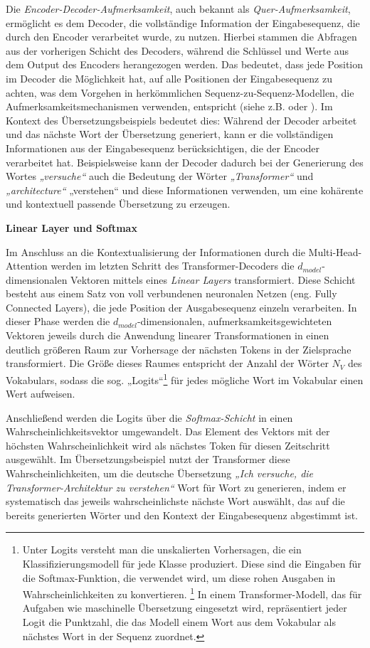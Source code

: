 Die \emph{Encoder-Decoder-Aufmerksamkeit}, auch bekannt als \emph{Quer-Aufmerksamkeit}, ermöglicht es dem Decoder, die vollständige Information der Eingabesequenz, die durch den Encoder verarbeitet wurde, zu nutzen. Hierbei stammen die Abfragen aus der vorherigen Schicht des Decoders, während die Schlüssel und Werte aus dem Output des Encoders herangezogen werden. Das bedeutet, dass jede Position im Decoder die Möglichkeit hat, auf alle Positionen der Eingabesequenz zu achten, was dem Vorgehen in herkömmlichen Sequenz-zu-Sequenz-Modellen, die Aufmerksamkeitsmechanismen verwenden, entspricht (siehe z.B. \cite{Conv_Seq2Seq_Learning} oder \cite{GoogleNeuralMachineTranslation}). Im Kontext des Übersetzungsbeispiels bedeutet dies: Während der Decoder arbeitet und das nächste Wort der Übersetzung generiert, kann er die vollständigen Informationen aus der Eingabesequenz berücksichtigen, die der Encoder verarbeitet hat. Beispielsweise kann der Decoder dadurch bei der Generierung des Wortes \emph{„versuche“} auch die Bedeutung der Wörter \emph{„Transformer“} und \emph{„architecture“} „verstehen“ und diese Informationen verwenden, um eine kohärente und kontextuell passende Übersetzung zu erzeugen.

\textbf{Linear Layer und Softmax}

Im Anschluss an die Kontextualisierung der Informationen durch die Multi-Head-Attention werden im letzten Schritt des Transformer-Decoders die $d_{model}$-dimensionalen Vektoren mittels eines \emph{Linear Layers} transformiert. Diese Schicht besteht aus einem Satz von voll verbundenen neuronalen Netzen (eng. Fully Connected Layers), die jede Position der Ausgabesequenz einzeln verarbeiten. In dieser Phase werden die $d_{model}$-dimensionalen, aufmerksamkeitsgewichteten Vektoren jeweils durch die Anwendung linearer Transformationen in einen deutlich größeren Raum zur Vorhersage der nächsten Tokens in der Zielsprache transformiert. Die Größe dieses Raumes entspricht der Anzahl der Wörter $N_V$ des Vokabulars, sodass die sog. „Logits“\footnote{Unter Logits versteht man die unskalierten Vorhersagen, die ein Klassifizierungsmodell für jede Klasse produziert. Diese sind die Eingaben für die Softmax-Funktion, die verwendet wird, um diese rohen Ausgaben in Wahrscheinlichkeiten zu konvertieren. \footcite{MitigatingNNOverconfidenceWithLogitNormalization} In einem Transformer-Modell, das für Aufgaben wie maschinelle Übersetzung eingesetzt wird, repräsentiert jeder Logit die Punktzahl, die das Modell einem Wort aus dem Vokabular als nächstes Wort in der Sequenz zuordnet.} für jedes mögliche Wort im Vokabular einen Wert aufweisen. 

Anschließend werden die Logits über die \emph{Softmax-Schicht} in einen Wahrscheinlichkeitsvektor umgewandelt. Das Element des Vektors mit der höchsten Wahrscheinlichkeit wird als nächstes Token für diesen Zeitschritt ausgewählt. Im Übersetzungsbeispiel nutzt der Transformer diese Wahrscheinlichkeiten, um die deutsche Übersetzung \emph{„Ich versuche, die Transformer-Architektur zu verstehen“} Wort für Wort zu generieren, indem er systematisch das jeweils wahrscheinlichste nächste Wort auswählt, das auf die bereits generierten Wörter und den Kontext der Eingabesequenz abgestimmt ist. \cite{Formal_Algorithms_for_Transformers_DeepMind}
